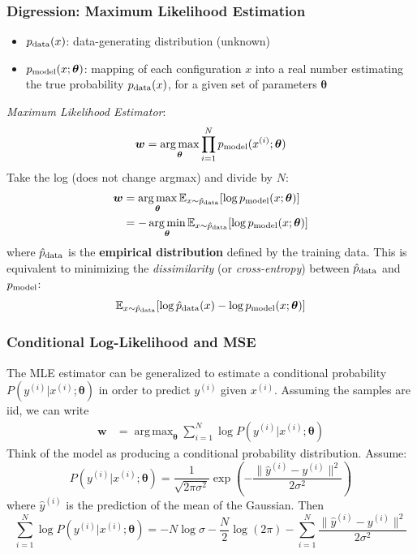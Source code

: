 \documentclass{beamer}
\DeclareMathOperator*{\argmax}{arg\,max}
\DeclareMathOperator*{\argmin}{arg\,min}
\begin{document}
	\begin{frame}
		\frametitle{Digression: Maximum Likelihood Estimation}
		\begin{itemize}
			\item $p_{\rm data}(x)$: data-generating distribution (unknown)
			\item $p_{\rm model}(x; \bm{\theta})$: mapping of each configuration $x$ into a real number estimating the true probability $p_{\rm data}(x)$, for a given set of parameters $\bm{\theta}$
		\end{itemize}	
		\vspace{2mm}
		\textit{Maximum Likelihood Estimator}:
		$$ \bm{w} = \argmax_{\bm{\theta}} \prod_{i=1}^{N} p_{\rm model}(x^{(i)}; \bm{\theta}) $$
		Take the log (does not change argmax) and divide by $N$:
		\begin{align*}
			\bm{w} &= \argmax_{\bm{\theta}}\mathbb{E}_{x \sim \hat{p}_{\rm data}} [\log p_{\rm model}(x; \bm{\theta})] \\
			&= -\argmin_{\bm{\theta}}\mathbb{E}_{x \sim \hat{p}_{\rm data}} [\log p_{\rm model}(x; \bm{\theta})]
		\end{align*} 
		where $\hat{p}_{\rm data}$ is the \textbf{empirical distribution} defined by the training data.
		This is equivalent to minimizing the \textit{dissimilarity} (or \textit{cross-entropy}) between $ \hat{p}_{\rm data}$ and $p_{\rm model}$:
		$$ \mathbb{E}_{x \sim \hat{p}_{\rm data}} [\log \hat{p}_{\rm data}(x)-\log p_{\rm model}(x; \bm{\theta})] $$
	\end{frame}
	
	\begin{frame}
		\frametitle{Conditional Log-Likelihood and MSE}
		The MLE estimator can be generalized to estimate a conditional probability $P(y^{(i)} | x^{(i)}; \bm{\theta})$ in order to predict $y^{(i)}$ given $x^{(i)}$. Assuming the samples are iid, we can write
		\begin{align*}
			\bm{w} &= \argmax_{\bm{\theta}}\sum_{i=1}^{N}\log P(y^{(i)} | x^{(i)}; \bm{\theta})
		\end{align*} 
		Think of the model as producing a conditional probability distribution. Assume:
		$$ P(y^{(i)} | x^{(i)}; \bm{\theta}) = \frac{1}{\sqrt{2\pi\sigma^2}} \exp\left(-\frac{\|\hat{y}^{(i)}-y^{(i)}\|^2}{2\sigma^2}\right)$$
		where $\hat{y}^{(i)}$ is the prediction of the mean of the Gaussian. Then
		$$\sum_{i=1}^{N}\log P(y^{(i)} | x^{(i)}; \bm{\theta}) = -N\log \sigma - \frac{N}{2}\log (2\pi) - \sum_{i=1}^{N}\frac{\|\hat{y}^{(i)}-y^{(i)}\|^2}{2\sigma^2}$$
	\end{frame}
	
\end{document}
